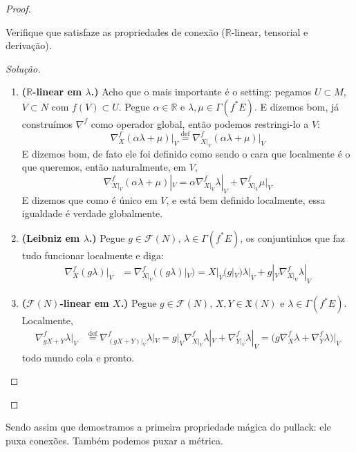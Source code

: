 \begin{proof}
\begin{exercise}\leavevmode
Verifique que satisfaze as propriedades de conexão (\(\mathbb{R}\)-linear, tensorial e derivação).
\end{exercise}
\begin{proof}[Solução]\leavevmode
\begin{enumerate}
\item \textbf{(\( \mathbb{R}\)-linear em \(\lambda\).)} Acho que o mais importante é o setting: pegamos \(U\subset M\), \(V \subset N\) com \(f(V)\subset U\). Pegue \(\alpha \in \mathbb{R}\) e \(\lambda,\mu \in \Gamma(f^*E)\). E dizemos bom, já construímos \(\nabla^f\) como operador global, então podemos restringi-lo a \(V\):
	\[\nabla_X^f(\alpha \lambda+\mu)\Big|_{V}\overset{\operatorname{def}}{=}\nabla_{X|_{V}}^f(\alpha \lambda +\mu)|_{V}\]
E dizemos bom, de fato ele foi definido como sendo o cara que localmente é o que queremos, então naturalmente, em \(V\),
\[\nabla^f_{X|_{V}}(\alpha\lambda+\mu)|_{V}=\alpha\nabla^f_{X|_{V}}\lambda|_{V}+\nabla^f_{X|_{V}}\mu|_{V}\]
E dizemos que como é único em \(V\), e está bem definido localmente, essa igualdade é verdade globalmente.
\item \textbf{(Leibniz em \(\lambda\).)} Pegue \(g \in \mathcal{F}(N)\), \(\lambda\in\Gamma(f^*E)\), os conjuntinhos que faz tudo funcionar localmente e diga:
	\begin{align*}
	\nabla^f_X(g\lambda)\Big|_{V}&=\nabla^f_{X|_{V}}\Big((g\lambda)|_{V}\Big)=X|_{V}(g|_{V}) \lambda|_{V}+g|_{V}\nabla^f_{X|_{V}}\lambda|_{V}
	\end{align*}
\item \textbf{(\(\mathcal{F}(N)\)-linear em \(X\).)} Pegue \(g \in \mathcal{F}(N)\), \(X,Y \in \mathfrak{X}(N)\) e \(\lambda \in \Gamma(f^*E)\). Localmente,
	\begin{align*}
	\nabla^f_{gX+Y}\lambda\Big|_{V}&\overset{\operatorname{def}}{=}\nabla^f_{(gX+Y)|_{V}}\lambda |_{V}=g|_{V}\nabla^f_{X|_{V}}\lambda|_{V}+\nabla^f_{Y|_{V}}\lambda|_{V}=\Big(g\nabla^f_X\lambda+\nabla^f_Y\lambda\Big)\Big|_{V}
	\end{align*}
	todo mundo cola e pronto.
\end{enumerate}
\end{proof}
\end{proof}

Sendo assim que demostramos a primeira propriedade mágica do pullack: ele puxa conexões. Também podemos puxar a métrica.

